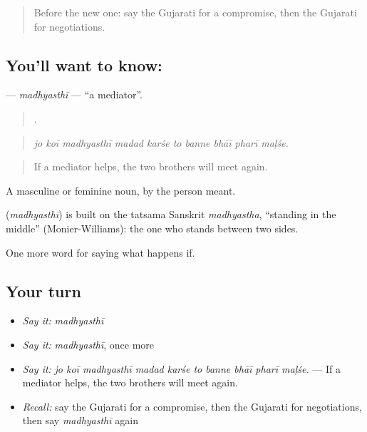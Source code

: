 \label{lesson:GU-C542-madhyasthi}



\begin{quote}
Before the new one: say the Gujarati for a compromise, then the Gujarati for negotiations.
\end{quote}

\subsection*{You'll want to know: }
\textbf{} — \emph{madhyasthī} — \textquotedblleft{}a mediator\textquotedblright{}.

\begin{quote}
         .
\end{quote}

\begin{quote}
\emph{jo koī madhyasthī madad karśe to banne bhāī pharī maḷśe.}
\end{quote}

\begin{quote}
If a mediator helps, the two brothers will meet again.
\end{quote}

A masculine or feminine noun, by the person meant.

\begin{cousinweb}
\textbf{} (\emph{madhyasthī}) is built on the tatsama Sanskrit \emph{madhyastha}, \textquotedblleft{}standing in the middle\textquotedblright{} (Monier-Williams): the one who stands between two sides.
\end{cousinweb}

\begin{grammarlens}[title={What you've built}]
One more word for saying what happens if.
\end{grammarlens}

\subsection*{Your turn}
\begin{itemize}
\raggedright
  \item \emph{Say it:} \emph{madhyasthī}
  \item \emph{Say it:} \emph{madhyasthī}, once more
  \item \emph{Say it:} \emph{jo koī madhyasthī madad karśe to banne bhāī pharī maḷśe.} — If a mediator helps, the two brothers will meet again.
  \item \emph{Recall:} say the Gujarati for a compromise, then the Gujarati for negotiations, then say \emph{madhyasthī} again
\end{itemize}

